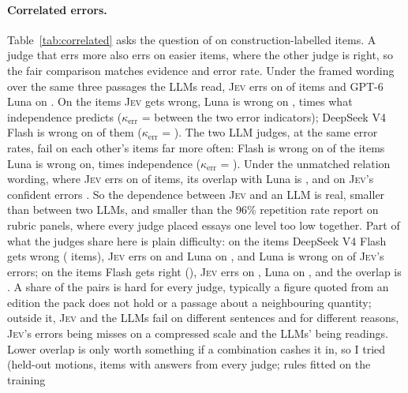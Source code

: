 \documentclass[11pt,a4paper]{article}
\newcommand{\jev}{\textsc{Jev}}
\begin{document}
\begin{table}[t]
\centering\small
{}
\caption{Correlated errors. An error is a wrong binary decision on an item; \jev{} decides at 0.5 under the wording in the first column, and a confident \jev{} error has $p \le 0.2$ on an altered sentence or $p \ge 0.8$ on an unchanged one. The independence baseline for each conditional rate is the LLM's own error rate in the third column. $\kappa_{\text{err}}$ is Cohen's $\kappa$ between the two judges' error indicators.}
\label{tab:correlated}
\end{table}

\paragraph{Correlated errors.} Table~\ref{tab:correlated} asks the question of \citet{rao2026jev} on construction-labelled items. A judge that errs more also errs on easier items, where the other judge is right, so the fair comparison matches evidence and error rate. Under the framed wording over the same three passages the LLMs read, \jev{} errs on \corrJevFramedThreeGptSixluna{} of items and GPT-6 Luna on \corrBaseFramedThreeGptSixluna{}. On the items \jev{} gets wrong, Luna is wrong on \corrGivenFramedThreeGptSixluna{}, \corrLiftFramedThreeGptSixluna{} times what independence predicts ($\kappa_{\text{err}}$ = \corrKappaFramedThreeGptSixluna{} between the two error indicators); DeepSeek V4 Flash is wrong on \corrGivenFramedThreeDeepseekvFourflash{} of them ($\kappa_{\text{err}}$ = \corrKappaFramedThreeDeepseekvFourflash{}). The two LLM judges, at the same error rates, fail on each other's items far more often: Flash is wrong on \corrLlmGiven{} of the items Luna is wrong on, \corrLlmLift{} times independence ($\kappa_{\text{err}}$ = \corrLlmKappa{}). Under the unmatched relation wording, where \jev{} errs on \corrJevSharpThreeGptSixluna{} of items, its overlap with Luna is \corrGivenSharpThreeGptSixluna{}, and on \jev{}'s \corrNSharpThreeGptSixluna{} confident errors \corrConfSharpThreeGptSixluna{}. So the dependence between \jev{} and an LLM is real, smaller than between two LLMs, and smaller than the 96\% repetition rate \citet{rao2026jev} report on rubric panels, where every judge placed essays one level too low together. Part of what the judges share here is plain difficulty: on the items DeepSeek V4 Flash gets wrong (\stratHardN{} items), \jev{} errs on \stratHardJev{} and Luna on \stratHardLlm{}, and Luna is wrong on \stratHardGiven{} of \jev{}'s errors; on the items Flash gets right (\stratEasyN{}), \jev{} errs on \stratEasyJev{}, Luna on \stratEasyLlm{}, and the overlap is \stratEasyGiven{}. A share of the pairs is hard for every judge, typically a figure quoted from an edition the pack does not hold or a passage about a neighbouring quantity; outside it, \jev{} and the LLMs fail on different sentences and for different reasons, \jev{}'s errors being misses on a compressed scale and the LLMs' being readings. Lower overlap is only worth something if a combination cashes it in, so I tried (held-out motions, \combN{} items with answers from every judge; rules fitted on the training 
\end{document}
